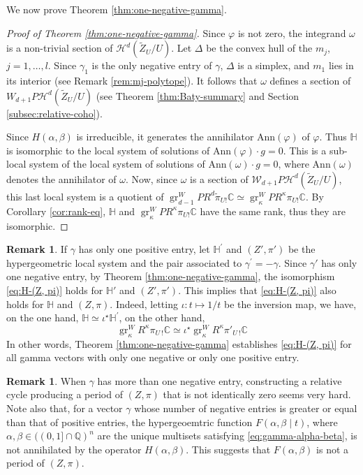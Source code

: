 \documentclass[11pt, reqno]{amsart}
\theoremstyle{plain}
\theoremstyle{definition}
\newtheorem{rem}[thm]{Remark}
\newcommand{\CC}{\mathbb{C}}
\newcommand{\QQ}{\mathbb{Q}}
\newcommand{\HH}{\mathbb{H}}
\DeclareMathOperator{\gr}{gr}
\begin{document}
We now prove Theorem \ref{thm:one-negative-gamma}.
\begin{proof}[Proof of Theorem \ref{thm:one-negative-gamma}]
Since $\varphi$ is not zero, the integrand $\omega$ is a non-trivial section of $\mathcal{H}^d(\widetilde{Z}_U/U)$.
Let $\Delta$ be the convex hull of the $m_j$, $j=1, \dots, l$. Since $\gamma_1$ is the only negative entry of $\gamma$, $\Delta$ is a simplex, and $m_1$ lies in its interior (see Remark \ref{rem:mj-polytope}). It follows that $\omega$ defines a section of ${W}_{d+1}P\mathcal{H}^d(\widetilde{Z}_U/U)$ (see Theorem \ref{thm:Baty-summary} and Section \ref{subsec:relative-coho}).

Since $H(\alpha, \beta)$  is irreducible, it generates the annihilator $\mathrm{Ann}(\varphi)$ of $\varphi$. Thus $\HH$ is isomorphic to the local system of solutions of $\mathrm{Ann} (\varphi)\cdot g=0$. This is a sub-local system of the local system of solutions of $\mathrm{Ann}(\omega) \cdot g=0$, where $\mathrm{Ann}(\omega)$ denotes the annihilator of $\omega$. Now, since $\omega$ is a section of $\mathcal{W}_{d+1}P\mathcal{H}^d(\widetilde{Z}_U/U)$, this last local system is a quotient of $\gr^W_{d-1}PR^d \widetilde{\pi}_{U !} \CC \simeq \gr^W_{\kappa}PR^{\kappa} {\pi}_{U !} \CC$. By Corollary \ref{cor:rank-eq}, $\HH$ and  $\gr^W_{\kappa}PR^{\kappa} {\pi}_{U !} \CC$ have the same rank, thus they are isomorphic. 
\end{proof}



\begin{rem}
If $\gamma$ has only one positive entry, let $\HH^\prime$ and $(Z', \pi')$ be the hypergeometric local system and the pair associated to $\gamma^\prime=-\gamma$. Since $\gamma'$ has only one negative entry, by Theorem \ref{thm:one-negative-gamma}, the isomorphism \eqref{eq:H-(Z, pi)} holds for $\HH'$ and $(Z', \pi')$. This implies that  \eqref{eq:H-(Z, pi)} also holds for $\HH$ and  $(Z, \pi)$. 
Indeed, letting $\iota \colon t \mapsto 1/t$ be the inversion map, we have, on the one hand, $\HH\simeq \iota^\star \HH^\prime$, on the other hand, 
\[
\gr^W_\kappa R^\kappa \pi_{U \ !} \CC \simeq \iota^\star \gr^W_\kappa R^\kappa \pi'_{U \ !} \CC  
\]
In other words, Theorem \ref{thm:one-negative-gamma} establishes  \eqref{eq:H-(Z, pi)} for all gamma vectors with only one negative or only one positive entry. 
\end{rem}


\begin{rem}
When $\gamma$ has more than one negative entry,  constructing a relative cycle producing a period of $(Z, \pi)$ that is not identically zero seems very hard. 
Note also that, for a vector $\gamma$ whose number of negative entries is greater or equal than that of positive entries, the hypergeoemtric function $F(\alpha, \beta \mid t)$, where $\alpha, \beta \in ((0,1]\cap \QQ)^n$ are the unique multisets satisfying \eqref{eq:gamma-alpha-beta}, is not annihilated by the operator $H(\alpha, \beta)$.
This suggests that $F(\alpha, \beta)$ is not a period of $(Z, \pi)$. 
\end{rem}
\end{document}
